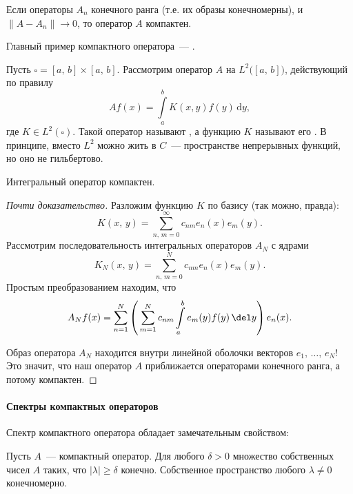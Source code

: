 \documentclass{trlnotes}
\begin{document}
    \begin{cor}
        Если операторы $A_n$ конечного ранга (т.е. их образы конечномерны), и $\|A - A_n\| \to 0$, то оператор $A$ компактен.
    \end{cor}

    Главный пример компактного оператора~--- .

    \begin{exm}
        Пусть $\square = [a, \, b] \times [a, \, b]$. Рассмотрим оператор $A$ на $L^2\big([a, \, b]\big)$, действующий по правилу
        \[
            Af(x) = \int\limits_a^b K(x, y) f(y) \, \mathrm{d}y,
        \]
        где $K \in L^2(\square)$. Такой оператор называют , а функцию $K$ называют его . В принципе, вместо $L^2$ можно жить в $C$~--- пространстве непрерывных функций, но оно не гильбертово.   
    \end{exm}

    \begin{st}
        Интегральный оператор компактен.
        \begin{proof}[Почти доказательство]
            Разложим функцию $K$ по базису (так можно, правда):
            \[
                K(x, \, y) = \sum\limits_{n, \, m = 0}^{\infty} c_{nm} e_n(x) e_m(y).
            \]
            Рассмотрим последовательность интегральных операторов $A_N$ с ядрами
            \[
                K_N(x, \, y) = \sum\limits_{n, \, m = 0}^{N} c_{nm} e_n(x) e_m(y).
            \]
            Простым преобразованием находим, что
            \[
                A_N f(x) = \sum\limits_{n = 1}^N \left(\,\sum\limits_{m = 1}^N c_{nm} \int\limits_a^b e_m(y) f(y) \, \del y\right) e_n(x).
            \]

            Образ оператора $A_N$ находится внутри линейной оболочки векторов $e_1, \, \ldots, \, e_N$! Это значит, что наш оператор $A$ приближается операторами конечного ранга, а потому компактен.
        \end{proof}
    \end{st}

    \paragraph{Спектры компактных операторов}

    Спектр компактного оператора обладает замечательным свойством:

    \begin{st}
        Пусть $A$~--- компактный оператор. Для любого $\delta > 0$ множество собственных чисел $A$ таких, что $|\lambda| \geqslant \delta$ конечно. Собственное пространство любого $\lambda \neq 0$ конечномерно. 
    \end{st}
\end{document}
